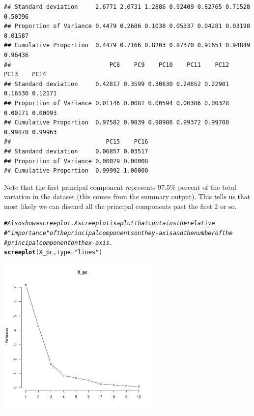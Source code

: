 \documentclass{article}\usepackage[]{graphicx}\usepackage[]{color}
\makeatletter
\newcommand{\hlstr}[1]{\textcolor[rgb]{0.192,0.494,0.8}{#1}}%
\newcommand{\hlcom}[1]{\textcolor[rgb]{0.678,0.584,0.686}{\textit{#1}}}%
\newcommand{\hlstd}[1]{\textcolor[rgb]{0.345,0.345,0.345}{#1}}%
\newcommand{\hlkwc}[1]{\textcolor[rgb]{0.333,0.667,0.333}{#1}}%
\newcommand{\hlkwd}[1]{\textcolor[rgb]{0.737,0.353,0.396}{\textbf{#1}}}%
\newenvironment{kframe}{%
 \def\at@end@of@kframe{}%
 \ifinner\ifhmode%
  \def\at@end@of@kframe{\end{minipage}}%
  \begin{minipage}{\columnwidth}%
 \fi\fi%
 \def\FrameCommand##1{\hskip\@totalleftmargin \hskip-\fboxsep
 \colorbox{shadecolor}{##1}\hskip-\fboxsep
     \hskip-\linewidth \hskip-\@totalleftmargin \hskip\columnwidth}%
 \MakeFramed {\advance\hsize-\width
   \@totalleftmargin\z@ \linewidth\hsize
   \@setminipage}}%
 {\par\unskip\endMakeFramed%
 \at@end@of@kframe}
\newenvironment{knitrout}{}{} %
\makeatother
\begin{document}
\begin{knitrout}
\begin{kframe}
\begin{verbatim}
## Standard deviation     2.6771 2.0731 1.2886 0.92409 0.82765 0.71528 0.50396
## Proportion of Variance 0.4479 0.2686 0.1038 0.05337 0.04281 0.03198 0.01587
## Cumulative Proportion  0.4479 0.7166 0.8203 0.87370 0.91651 0.94849 0.96436
##                            PC8    PC9    PC10    PC11    PC12    PC13    PC14
## Standard deviation     0.42817 0.3599 0.30830 0.24852 0.22901 0.16530 0.12171
## Proportion of Variance 0.01146 0.0081 0.00594 0.00386 0.00328 0.00171 0.00093
## Cumulative Proportion  0.97582 0.9839 0.98986 0.99372 0.99700 0.99870 0.99963
##                           PC15    PC16
## Standard deviation     0.06857 0.03517
## Proportion of Variance 0.00029 0.00008
## Cumulative Proportion  0.99992 1.00000
\end{verbatim}
\end{kframe}
\end{knitrout}

Note that the first principal component represents 97.5\% percent of the total variation in the dataset (this comes from the summary output). This tells us that most likely we can discard all the principal components past the first 2 or so.

\begin{knitrout}
\color{fgcolor}\begin{kframe}
\begin{alltt}
\hlcom{# Also show a scree plot. A scree plot is a plot that contains the relative}
\hlcom{# "importance" of the principal components on the y-axis and the number of the}
\hlcom{# principal component on the x-axis.}
\hlkwd{screeplot}\hlstd{(X_pc,} \hlkwc{type} \hlstd{=} \hlstr{"lines"}\hlstd{)}
\end{alltt}
\end{kframe}

{\centering \includegraphics[width=0.6\textwidth]{figure/unnamed-chunk-3-1} 

}



\end{knitrout}
\end{document}
